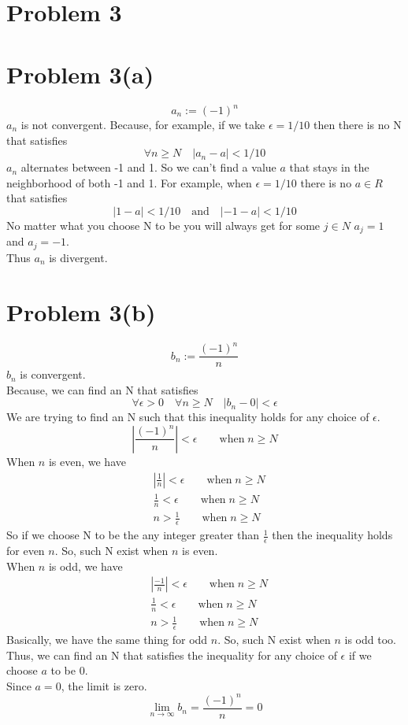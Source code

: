\documentclass{article}
\begin{document}
\section*{Problem 3}

\section*{Problem 3(a)}
\[
   a_n := (-1)^n
\]
\(a_n\) is not convergent. Because, for example, if we take \(\epsilon = 1/10\) then there is no N that satisfies
\[
   \forall n \geq N \quad |a_n - a| < 1/10
\]
\(a_n\) alternates between -1 and 1. So we can't find a value \(a\) that stays in the neighborhood of both -1 and 1.
For example, when \(\epsilon = 1/10\) there is no \(a \in R\) that satisfies
\[
   |1 - a| < 1/10 \quad \text{and} \quad |-1 - a| < 1/10
\]
No matter what you choose N to be you will always get for some \(j \in N\) \(a_j = 1\) and \(a_j = -1\). \\
Thus \(a_n\) is divergent.\\

\section*{Problem 3(b)}
\[
   b_n := \frac{(-1)^n}{n}
\]
\(b_n\) is convergent.\\
Because, we can find an N that satisfies
\[
   \forall \epsilon > 0 \quad \forall n \geq N \quad |b_n - 0| < \epsilon
\]
We are trying to find an N such that this inequality holds for any choice of \(\epsilon\).\\
\[
   |\frac{(-1)^n}{n}| < \epsilon \qquad \text{when} \; n \geq N
\]
When \(n\) is even, we have
\begin{align*}
   & |\frac{1}{n}| < \epsilon \qquad \text{when} \; n \geq N \\
   & \frac{1}{n} < \epsilon \qquad \text{when} \; n \geq N \\
   & n > \frac{1}{\epsilon} \qquad \text{when} \; n \geq N
\end{align*}
So if we choose N to be the any integer greater than \(\frac{1}{\epsilon}\) then the inequality holds for even \(n\). So, such N exist when \(n\) is even. \\
When \(n\) is odd, we have
\begin{align*}
   & |\frac{-1}{n}| < \epsilon \qquad \text{when} \; n \geq N \\
   & \frac{1}{n} < \epsilon \qquad \text{when} \; n \geq N \\
   & n > \frac{1}{\epsilon} \qquad \text{when} \; n \geq N
\end{align*}
Basically, we have the same thing for odd \(n\). So, such N exist when \(n\) is odd too. \\
Thus, we can find an N that satisfies the inequality for any choice of \(\epsilon\) if we choose \(a\) to be 0.\\
Since \(a = 0\), the limit is zero.\\
\[
   \lim_{n \to \infty} b_n = \frac{(-1)^n}{n} = 0
\]
\end{document}
